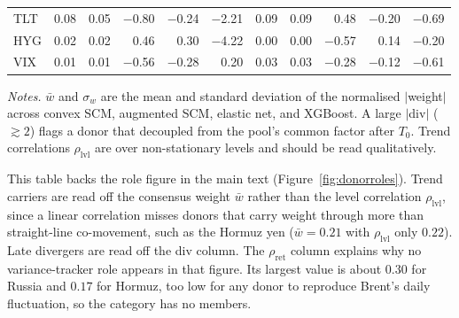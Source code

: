 \begin{table}[h]
\begin{threeparttable}
\begin{tabular}{@{}l rrrrr rrrrr@{}}
TLT & 0.08 & 0.05 & $-$0.80 & $-$0.24 & $-$2.21 & 0.09 & 0.09 & 0.48 & $-$0.20 & $-$0.69 \\
HYG & 0.02 & 0.02 & 0.46 & 0.30 & $-$4.22 & 0.00 & 0.00 & $-$0.57 & 0.14 & $-$0.20 \\
VIX & 0.01 & 0.01 & $-$0.56 & $-$0.28 & 0.20 & 0.03 & 0.03 & $-$0.28 & $-$0.12 & $-$0.61 \\
\bottomrule
\end{tabular}
\begin{tablenotes}[flushleft]
\footnotesize
\item \textit{Notes.} $\bar w$ and $\sigma_w$ are the mean and standard deviation of the
normalised $|$weight$|$ across convex SCM, augmented SCM, elastic net, and XGBoost. A
large $|$div$|$ ($\gtrsim 2$) flags a donor that decoupled from the pool's common factor
after $T_0$. Trend correlations $\rho_{\text{lvl}}$ are over non-stationary levels and
should be read qualitatively.
\end{tablenotes}
\end{threeparttable}
\end{table}

This table backs the role figure in the main text (Figure~\ref{fig:donorroles}). Trend
carriers are read off the consensus weight $\bar w$ rather than the level correlation
$\rho_{\text{lvl}}$, since a linear correlation misses donors that carry weight through more
than straight-line co-movement, such as the Hormuz yen ($\bar w=0.21$ with $\rho_{\text{lvl}}$
only $0.22$). Late divergers are read off the div column. The $\rho_{\text{ret}}$ column
explains why no variance-tracker role appears in that figure. Its largest value is about
$0.30$ for Russia and $0.17$ for Hormuz, too low for any donor to reproduce Brent's daily
fluctuation, so the category has no members.

